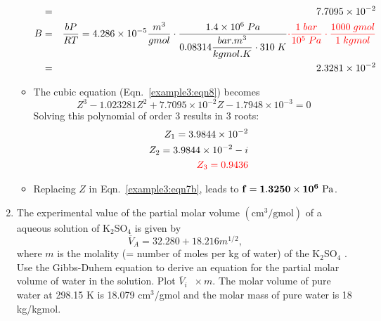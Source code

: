 \documentclass[12pts,a4paper,amsmath,amssymb,floatfix]{article}%
\newcommand{\frc}{\displaystyle\frac}
\newcommand{\red}{\textcolor{red}}
\begin{document}
\begin{enumerate}[label=\bfseries Example \arabic*]
\begin{itemize}
\begin{eqnarray}
                &=& 7.7095\times 10^{-2} \nonumber \\
              B &=& \frc{bP}{RT} = 4.286\times 10^{-5} \frc{m^{3}}{gmol}\cdot \frc{1.4\times 10^{6}\;Pa}{0.08314 \frc{bar.m^{3}}{kgmol.K}\cdot 310\;K}\red{\cdot \frc{1\;bar}{10^{5}\;Pa}\cdot\frc{1000\; gmol}{1\; kgmol}} \nonumber \\
                &=& 2.3281\times 10^{-2} \nonumber
           \end{eqnarray}
      \item The cubic equation (Eqn.~\ref{example3:eqn8}) becomes
           \begin{displaymath}
              Z^{3} - 1.023281 Z^{2} + 7.7095\times 10^{-2} Z - 1.7948\times 10^{-3} = 0
           \end{displaymath}
           Solving this polynomial of order 3 results in 3 roots:
           \begin{eqnarray}
               &&Z_{1} = 3.9844\times 10^{-2} \nonumber\\
               &&Z_{2} = 3.9844\times 10^{-2} - i \nonumber\\
               &&\red{Z_{3} = 0.9436} \nonumber
           \end{eqnarray}
      \item Replacing $Z$ in Eqn.~\ref{example3:eqn7b}, leads to ${\bf f= 1.3250\times 10^{6}\text{ Pa}}$.
   
\end{itemize}

\clearpage

\item\label{Example:4} The experimental value of the partial molar volume $\left(\text{cm}^{3}/\text{gmol}\right)$ of a aqueous solution of K$_{2}$SO$_{4}$ is given by
                \begin{displaymath}
                   \overline{V}_{A} = 32.280 + 18.216 m^{1/2},
                \end{displaymath} 
 where $m$ is the molality (= number of moles per kg of water) of the K$_{2}$SO$_{4}$ . Use the Gibbs-Duhem equation to derive an equation for the partial molar volume of water in the solution. Plot $\overline{V}_{i}\;\;\times m$. The molar volume of pure water at 298.15 K is 18.079 cm$^{3}$/gmol and the molar mass of pure water is 18 kg/kgmol.

\bigskip


\end{enumerate}
\end{document}
